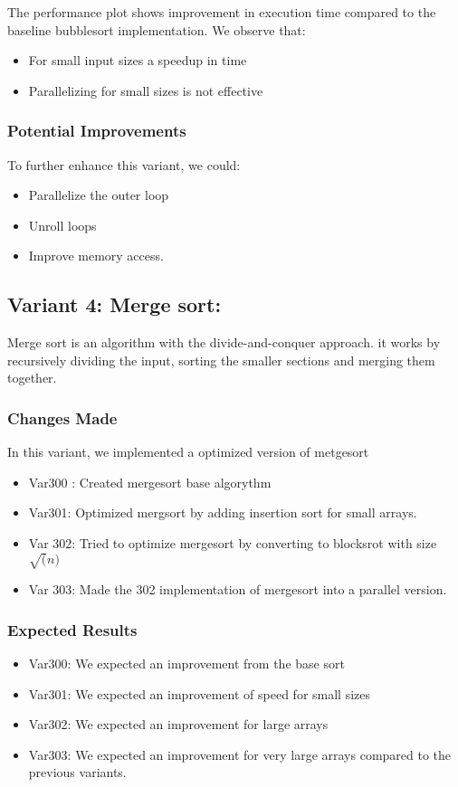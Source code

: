 \documentclass[twocolumn]{article}
\begin{document}
The performance plot shows improvement in execution time compared to the baseline bubblesort  implementation. We observe that:
\begin{itemize}
    \item For small input sizes a speedup in time
    \item Parallelizing for small sizes is not effective
\end{itemize}

\subsubsection{Potential Improvements}
To further enhance this variant, we could:
\begin{itemize}
    \item Parallelize the outer loop
    \item Unroll loops
    \item Improve memory access.
\end{itemize}

\subsection{Variant 4: Merge sort:}

Merge sort is an algorithm with the divide-and-conquer approach. it works by recursively dividing the input, sorting the smaller sections and merging them together.

\subsubsection{Changes Made}
In this variant, we implemented a optimized version of metgesort
\begin{itemize}
    \item Var300 : Created mergesort base algorythm
    \item Var301: Optimized mergsort by adding insertion sort for small arrays.
    \item Var 302: Tried to optimize mergesort by converting to blocksrot with size $\sqrt(n)$
    \item Var 303: Made the 302 implementation of mergesort into a parallel version.
\end{itemize}

\subsubsection{Expected Results}
\begin{itemize}
	\item Var300: We expected an improvement from the base sort
	\item Var301: We expected an improvement of speed for small sizes
	\item Var302: We expected an improvement for large arrays
	\item Var303: We expected an improvement for very large arrays compared to the previous variants.
\end{itemize}
\end{document}
